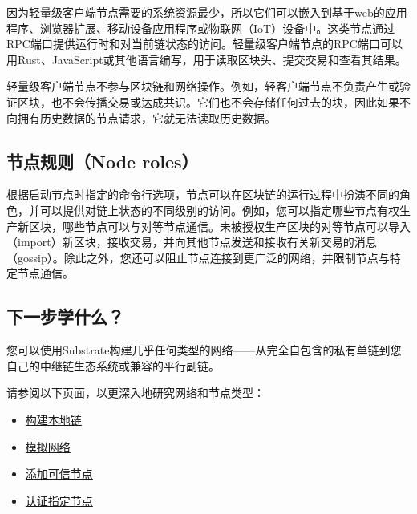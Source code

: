 因为轻量级客户端节点需要的系统资源最少，所以它们可以嵌入到基于web的应用程序、浏览器扩展、移动设备应用程序或物联网（IoT）设备中。这类节点通过RPC端口提供运行时和对当前链状态的访问。轻量级客户端节点的RPC端口可以用Rust、JavaScript或其他语言编写，用于读取区块头、提交交易和查看其结果。

轻量级客户端节点不参与区块链和网络操作。例如，轻客户端节点不负责产生或验证区块，也不会传播交易或达成共识。它们也不会存储任何过去的块，因此如果不向拥有历史数据的节点请求，它就无法读取历史数据。

\hypertarget{ux8282ux70b9ux89c4ux5219node-rolesuxff09}{%
\subsection{节点规则（Node
roles）}\label{ux8282ux70b9ux89c4ux5219node-rolesuxff09}}

根据启动节点时指定的命令行选项，节点可以在区块链的运行过程中扮演不同的角色，并可以提供对链上状态的不同级别的访问。例如，您可以指定哪些节点有权生产新区块，哪些节点可以与对等节点通信。未被授权生产区块的对等节点可以导入（import）新区块，接收交易，并向其他节点发送和接收有关新交易的消息（gossip）。除此之外，您还可以阻止节点连接到更广泛的网络，并限制节点与特定节点通信。

\hypertarget{ux4e0bux4e00ux6b65ux5b66ux4ec0ux4e48}{%
\subsection{下一步学什么？}\label{ux4e0bux4e00ux6b65ux5b66ux4ec0ux4e48}}

您可以使用Substrate构建几乎任何类型的网络------从完全自包含的私有单链到您自己的中继链生态系统或兼容的平行副链。

请参阅以下页面，以更深入地研究网络和节点类型：

\begin{itemize}
\item
  \href{/tutorials/get-started/build-local-blockchain/}{构建本地链}
\item
  \href{/tutorials/get-started/simulate-network/}{模拟网络}
\item
  \href{/tutorials/get-started/add-trusted-nodes/}{添加可信节点}
\item
  \href{/tutorials/get-started/authorize-specific-nodes/}{认证指定节点}
\end{itemize}

